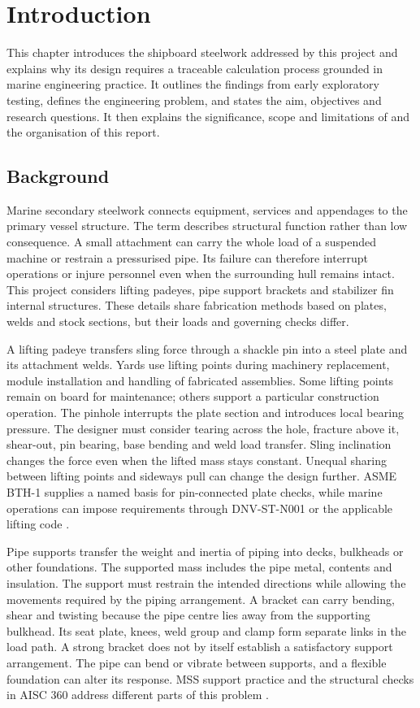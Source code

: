 \chapter{Introduction}
\label{chap:introduction}

This chapter introduces the shipboard steelwork addressed by this project and explains why its design requires a traceable calculation process grounded in marine engineering practice. It outlines the findings from early exploratory testing, defines the engineering problem, and states the aim, objectives and research questions. It then explains the significance, scope and limitations of \NEMO{} and the organisation of this report.

\section{Background}
\label{sec:background}

Marine secondary steelwork connects equipment, services and appendages to the primary vessel structure. The term describes structural function rather than low consequence. A small attachment can carry the whole load of a suspended machine or restrain a pressurised pipe. Its failure can therefore interrupt operations or injure personnel even when the surrounding hull remains intact. This project considers lifting padeyes, pipe support brackets and stabilizer fin internal structures. These details share fabrication methods based on plates, welds and stock sections, but their loads and governing checks differ.

A lifting padeye transfers sling force through a shackle pin into a steel plate and its attachment welds. Yards use lifting points during machinery replacement, module installation and handling of fabricated assemblies. Some lifting points remain on board for maintenance; others support a particular construction operation. The pinhole interrupts the plate section and introduces local bearing pressure. The designer must consider tearing across the hole, fracture above it, shear-out, pin bearing, base bending and weld load transfer. Sling inclination changes the force even when the lifted mass stays constant. Unequal sharing between lifting points and sideways pull can change the design further. ASME BTH-1 supplies a named basis for pin-connected plate checks, while marine operations can impose requirements through DNV-ST-N001 or the applicable lifting code \cite{asmeBTH1,dnvN001,lrLifting2026}.

Pipe supports transfer the weight and inertia of piping into decks, bulkheads or other foundations. The supported mass includes the pipe metal, contents and insulation. The support must restrain the intended directions while allowing the movements required by the piping arrangement. A bracket can carry bending, shear and twisting because the pipe centre lies away from the supporting bulkhead. Its seat plate, knees, weld group and clamp form separate links in the load path. A strong bracket does not by itself establish a satisfactory support arrangement. The pipe can bend or vibrate between supports, and a flexible foundation can alter its response. MSS support practice and the structural checks in AISC 360 address different parts of this problem \cite{mssSP58,aisc2016}.

